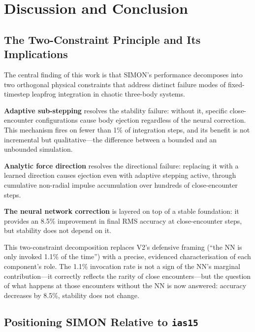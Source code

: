 \documentclass[12pt]{article}
\begin{document}
\section{Discussion and Conclusion}
\label{sec:discussion}

\subsection{The Two-Constraint Principle and Its Implications}

The central finding of this work is that SIMON's performance decomposes into two orthogonal
physical constraints that address distinct failure modes of fixed-timestep leapfrog
integration in chaotic three-body systems.

\textbf{Adaptive sub-stepping} resolves the stability failure: without it, specific
close-encounter configurations cause body ejection regardless of the neural correction.
This mechanism fires on fewer than 1\% of integration steps, and its benefit is not
incremental but qualitative---the difference between a bounded and an unbounded simulation.

\textbf{Analytic force direction} resolves the directional failure: replacing it with a
learned direction causes ejection even with adaptive stepping active, through cumulative
non-radial impulse accumulation over hundreds of close-encounter steps.

\textbf{The neural network correction} is layered on top of a stable foundation: it
provides an 8.5\% improvement in final RMS accuracy at close-encounter steps, but stability
does not depend on it.

This two-constraint decomposition replaces V2's defensive framing (``the NN is only invoked
1.1\% of the time'') with a precise, evidenced characterisation of each component's role.
The 1.1\% invocation rate is not a sign of the NN's marginal contribution---it correctly
reflects the rarity of close encounters---but the question of what happens at those encounters
without the NN is now answered: accuracy decreases by 8.5\%, stability does not change.

\subsection{Positioning SIMON Relative to \texttt{ias15}}
\end{document}
